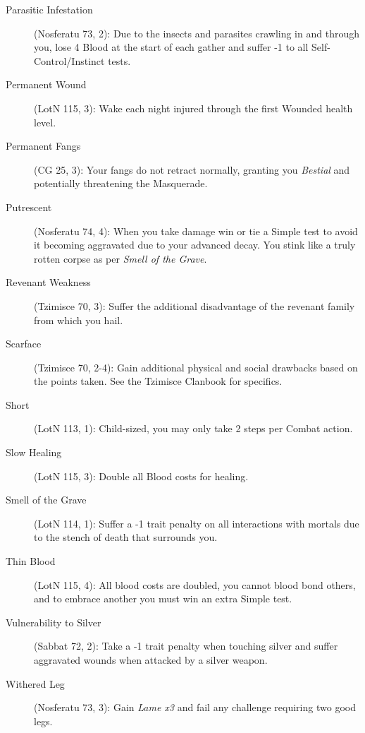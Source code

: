 \begin{description}
	\item[Parasitic Infestation] (Nosferatu 73, 2):  Due to the insects and parasites 
	crawling in and through you, lose 4 Blood at the start of each gather and suffer 
	-1 to all Self-Control/Instinct tests.
	\item[Permanent Wound] (LotN 115, 3):  Wake each night injured through the first 
	Wounded health level.
	\item[Permanent Fangs] (CG 25, 3):  Your fangs do not retract normally, granting you 
	\emph{Bestial} and potentially threatening the Masquerade.
	\item[Putrescent] (Nosferatu 74, 4):  When you take damage win or tie a Simple test 
	to avoid it becoming aggravated due to your advanced decay.  You stink like a truly 
	rotten corpse as per \emph{Smell of the Grave}.
	\item[Revenant Weakness] (Tzimisce 70, 3):  Suffer the additional disadvantage of the 
	revenant family from which you hail.
	\item[Scarface] (Tzimisce 70, 2-4):  Gain additional physical and social drawbacks based 
	on the points taken.  See the Tzimisce Clanbook for specifics.
	\item[Short] (LotN 113, 1):  Child-sized, you may only take 2 steps per Combat action.
	\item[Slow Healing] (LotN 115, 3):  Double all Blood costs for healing.
	\item[Smell of the Grave] (LotN 114, 1):  Suffer a -1 trait penalty on all interactions 
	with mortals due to the stench of death that surrounds you.
	\item[Thin Blood] (LotN 115, 4):  All blood costs are doubled, you cannot blood bond 
	others, and to embrace another you must win an extra Simple test.
	\item[Vulnerability to Silver] (Sabbat 72, 2):  Take a -1 trait penalty when touching 
	silver and suffer aggravated wounds when attacked by a silver weapon.
	\item[Withered Leg] (Nosferatu 73, 3):  Gain \emph{Lame x3} and fail any challenge 
	requiring two good legs.
\end{description}

